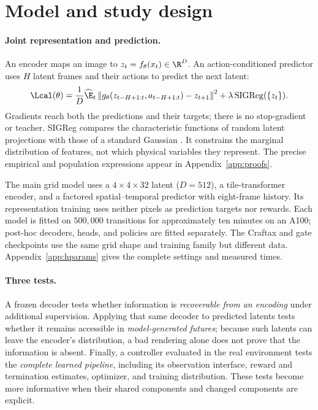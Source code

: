 \section{Model and study design}
\label{sec:worlds}

\paragraph{Joint representation and prediction.}
An encoder maps an image to $z_t=f_\theta(x_t)\in\R^D$. An action-conditioned predictor uses
$H$ latent frames and their actions to predict the next latent:
\begin{equation}
\label{eq:lewm}
\Lcal(\theta)=\frac{1}{D}\widehat{\E}_t\left\|g_\theta(z_{t-H+1:t},a_{t-H+1:t})-z_{t+1}\right\|^2
+\lambda\,\mathrm{SIGReg}(\{z_t\}).
\end{equation}
Gradients reach both the predictions and their targets; there is no stop-gradient or teacher.
SIGReg compares the characteristic functions of random latent projections with those of a standard
Gaussian \citep{balestriero2025lejepa}. It constrains the marginal distribution of features, not which
physical variables they represent. The precise empirical and population expressions appear in
Appendix~\ref{app:proofs}.

The main grid model uses a $4\times4\times32$ latent ($D=512$), a tile-transformer encoder, and a
factored spatial--temporal predictor with eight-frame history. Its representation training uses
neither pixels as prediction targets nor rewards. Each model is fitted on $500{,}000$ transitions
for approximately ten minutes on an A100; post-hoc decoders, heads, and policies are fitted separately.
The Craftax and gate checkpoints use the same grid shape and training family but different data.
Appendix~\ref{app:hparams} gives the complete settings and measured times.

\paragraph{Three tests.}
A frozen decoder tests whether information is \emph{recoverable from an encoding} under additional
supervision. Applying that same decoder to predicted latents tests whether it remains accessible in
\emph{model-generated futures}; because such latents can leave the encoder's distribution, a bad
rendering alone does not prove that the information is absent. Finally, a controller evaluated in
the real environment tests the \emph{complete learned pipeline}, including its observation interface,
reward and termination estimates, optimizer, and training distribution. These tests become more
informative when their shared components and changed components are explicit.
